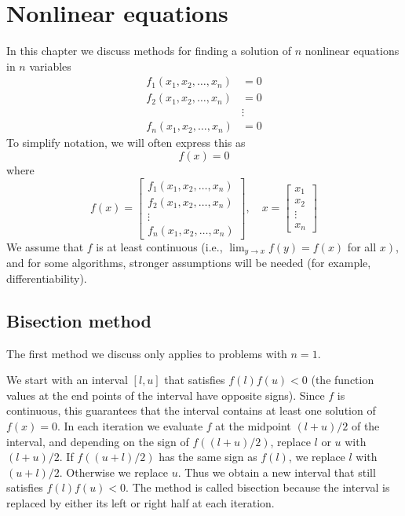 \chapter{Nonlinear equations}

In this chapter we discuss methods for finding a solution of $ n $ nonlinear equations in $ n $ variables
\begin{equation}
\begin{aligned}
f_{1}\left(x_{1}, x_{2}, \ldots, x_{n}\right) &=0 \\
f_{2}\left(x_{1}, x_{2}, \ldots, x_{n}\right) &=0 \\
& \vdots \\
f_{n}\left(x_{1}, x_{2}, \ldots, x_{n}\right) &=0
\end{aligned}
\end{equation}
To simplify notation, we will often express this as
\begin{equation}
f(x)=0
\end{equation}
where
\begin{equation}
f(x)=\left[\begin{array}{c}
f_{1}\left(x_{1}, x_{2}, \ldots, x_{n}\right) \\
f_{2}\left(x_{1}, x_{2}, \ldots, x_{n}\right) \\
\vdots \\
f_{n}\left(x_{1}, x_{2}, \ldots, x_{n}\right)
\end{array}\right], \quad x=\left[\begin{array}{c}
x_{1} \\
x_{2} \\
\vdots \\
x_{n}
\end{array}\right]
\end{equation}
We assume that $ f $ is at least continuous (i.e., $ \lim _{y \rightarrow x} f(y)=f(x) $ for all $ \left.x\right) $, and for some algorithms, stronger assumptions will be needed (for example, differentiability).

\section{Bisection method}

The first method we discuss only applies to problems with $ n=1 $.

We start with an interval $ [l, u] $ that satisfies $ f(l) f(u)<0 $ (the function values at the end points of the interval have opposite signs). Since $ f $ is continuous, this guarantees that the interval contains at least one solution of $ f(x)=0 $. In each iteration we evaluate $ f $ at the midpoint $ (l+u) / 2 $ of the interval, and depending on the sign of $ f((l+u) / 2) $, replace $ l $ or $ u $ with $ (l+u) / 2 $. If $ f((u+l) / 2) $ has the same sign as $ f(l) $, we replace $ l $ with $ (u+l) / 2 $. Otherwise we replace $ u $. Thus we obtain a new interval that still satisfies $ f(l) f(u)<0 $. The method is called bisection because the interval is replaced by either its left or right half at each iteration.

